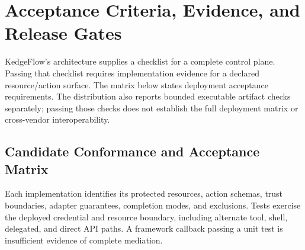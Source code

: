 \section{Acceptance Criteria, Evidence, and Release Gates}
\label{sec:acceptance}

KedgeFlow's architecture supplies a checklist for a complete control plane. Passing that checklist requires implementation evidence for a declared resource/action surface. The matrix below states deployment acceptance requirements. The distribution also reports bounded executable artifact checks separately; passing those checks does not establish the full deployment matrix or cross-vendor interoperability.

\subsection{Candidate Conformance and Acceptance Matrix}
Each implementation identifies its protected resources, action schemas, trust boundaries, adapter guarantees, completion modes, and exclusions. Tests exercise the deployed credential and resource boundary, including alternate tool, shell, delegated, and direct API paths. A framework callback passing a unit test is insufficient evidence of complete mediation.


